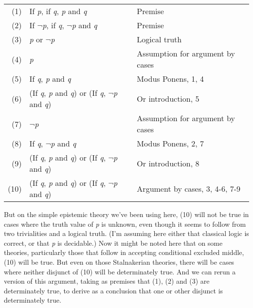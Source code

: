 \bigskip
\begin{tabular}{r l l}
(1)&If \textit{p}, if \textit{q}, \textit{p} and \textit{q}&Premise \\

(2)&If \(\neg\){}\textit{p}, if \textit{q}, \(\neg\){}\textit{p} and \textit{q}&Premise \\

(3)&\textit{p} or \(\neg\){}\textit{p}&Logical truth\\

(4)&\textit{p}&Assumption for argument by cases\\

(5)&If \textit{q}, \textit{p} and \textit{q}&Modus Ponens, 1, 4\\

(6)&(If \textit{q}, \textit{p} and \textit{q}) or (If \textit{q}, \(\neg\){}\textit{p} and \textit{q})&Or introduction, 5\\

(7)&\(\neg\){}\textit{p}&Assumption for argument by cases\\

(8)&If \textit{q}, \(\neg\){}\textit{p} and \textit{q}&Modus Ponens, 2, 7\\

(9)&(If \textit{q}, \textit{p} and \textit{q}) or (If \textit{q}, \(\neg\){}\textit{p} and \textit{q})&Or introduction, 8\\

(10)&(If \textit{q}, \textit{p} and \textit{q}) or (If \textit{q}, \(\neg\){}\textit{p} and \textit{q})&Argument by cases, 3, 4-6, 7-9\\
\end{tabular}
\bigskip

\noindent But on the simple epistemic theory we've been using here, (10) will not be true in cases where the truth value of \textit{p} is unknown, even though it seems to follow from two trivialities and a logical truth. (I'm assuming here either that classical logic is correct, or that \textit{p} is decidable.) Now it might be noted here that on some theories, particularly those that follow \cite{Stalnaker1981} in accepting conditional excluded middle, (10) will be true. But even on those Stalnakerian theories, there will be cases where neither disjunct of (10) will be determinately true. And we can rerun a version of this argument, taking as premises that (1), (2) and (3) are determinately true, to derive as a conclusion that one or other disjunct is determinately true.

